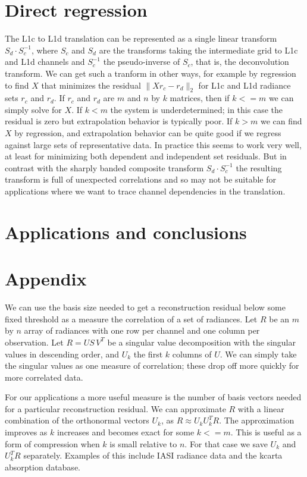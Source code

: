 \documentclass[11pt]{article}
\begin{document}
\FloatBarrier
\section{Direct regression}
\label{dregr}

The L1c to L1d translation can be represented as a single linear
transform $S_d\cdot S_c^{-1}$, where $S_c$ and $S_d$ are the
transforms taking the intermediate grid to L1c and L1d channels and
$S_c^{-1}$ the pseudo-inverse of $S_c$, that is, the deconvolution
transform.  We can get such a tranform in other ways, for example by
regression to find $X$ that minimizes the residual $\|X r_c -
r_d\|_2$ for L1c and L1d radiance sets $r_c$ and $r_d$.  If $r_c$ and
$r_d$ are $m$ and $n$ by $k$ matrices, then if $k <= m$ we can simply
solve for $X$.  If $k < m$ the system is underdetermined; in this
case the residual is zero but extrapolation behavior is typically
poor.  If $k > m$ we can find $X$ by regression, and extrapolation
behavior can be quite good if we regress against large sets of
representative data.  In practice this seems to work very well, at
least for minimizing both dependent and independent set residuals.
But in contrast with the sharply banded composite transform $S_d\cdot
S_c^{-1}$ the resulting transform is full of unexpected correlations
and so may not be suitable for applications where we want to trace
channel dependencies in the translation.

\FloatBarrier
\section{Applications and conclusions}
\label{appcon}

\FloatBarrier
\section{Appendix}
\label{append}

We can use the basis size needed to get a reconstruction residual
below some fixed threshold as a measure the correlation of a set of
radiances.  Let $R$ be an $m$ by $n$ array of radiances with one row
per channel and one column per observation.  Let $R=U S\,V^T$ be a
singular value decomposition with the singular values in descending
order, and $U_k$ the first $k$ columns of $U$.  We can simply take
the singular values as one measure of correlation; these drop off
more quickly for more correlated data.

For our applications a more useful measure is the number of basis
vectors needed for a particular reconstruction residual.  We can
approximate $R$ with a linear combination of the orthonormal vectors
$U_k$, as $R\approx U_k U_k^T R$.  The approximation improves as
$k$ increases and becomes exact for some $k <= m$.  This is useful
as a form of compression when $k$ is small relative to $n$.  For
that case we save $U_k$ and $U_k^T R$ separately.  Examples of this
include IASI radiance data and the kcarta absorption database.
\end{document}
